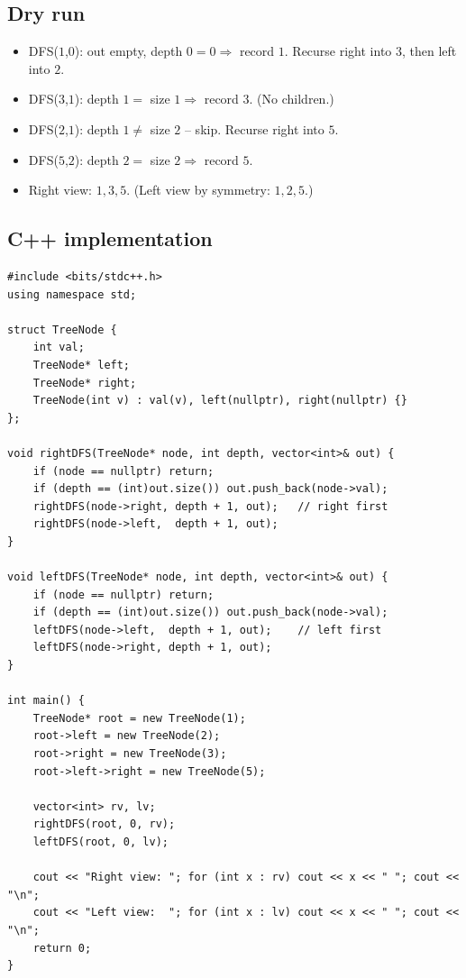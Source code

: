 \subsection*{Dry run}


\begin{itemize}
  \item DFS($1$,$0$): out empty, depth $0=0 \Rightarrow$ record $1$.
        Recurse right into $3$, then left into $2$.
  \item DFS($3$,$1$): depth $1=$ size $1 \Rightarrow$ record $3$. (No
        children.)
  \item DFS($2$,$1$): depth $1 \ne$ size $2$ -- skip. Recurse right into
        $5$.
  \item DFS($5$,$2$): depth $2=$ size $2 \Rightarrow$ record $5$.
  \item Right view: $1,3,5$. (Left view by symmetry: $1,2,5$.)
\end{itemize}

\subsection*{C++ implementation}

\begin{lstlisting}
#include <bits/stdc++.h>
using namespace std;

struct TreeNode {
    int val;
    TreeNode* left;
    TreeNode* right;
    TreeNode(int v) : val(v), left(nullptr), right(nullptr) {}
};

void rightDFS(TreeNode* node, int depth, vector<int>& out) {
    if (node == nullptr) return;
    if (depth == (int)out.size()) out.push_back(node->val);
    rightDFS(node->right, depth + 1, out);   // right first
    rightDFS(node->left,  depth + 1, out);
}

void leftDFS(TreeNode* node, int depth, vector<int>& out) {
    if (node == nullptr) return;
    if (depth == (int)out.size()) out.push_back(node->val);
    leftDFS(node->left,  depth + 1, out);    // left first
    leftDFS(node->right, depth + 1, out);
}

int main() {
    TreeNode* root = new TreeNode(1);
    root->left = new TreeNode(2);
    root->right = new TreeNode(3);
    root->left->right = new TreeNode(5);

    vector<int> rv, lv;
    rightDFS(root, 0, rv);
    leftDFS(root, 0, lv);

    cout << "Right view: "; for (int x : rv) cout << x << " "; cout << "\n";
    cout << "Left view:  "; for (int x : lv) cout << x << " "; cout << "\n";
    return 0;
}
\end{lstlisting}

